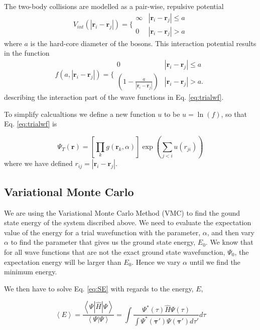 The two-body collisions are modelled as a pair-wise, repulsive potential 
 \begin{equation}
 V_{int}(|\mathbf{r}_i-\mathbf{r}_j|) =  \Bigg\{
 \begin{array}{ll}
	 \infty & {|\mathbf{r}_i-\mathbf{r}_j|} \leq {a}\\
	 0 & {|\mathbf{r}_i-\mathbf{r}_j|} > {a}
 \end{array}
 \end{equation}
where $a$ is the hard-core diameter of the bosons. This interaction potential results in the function
 \begin{equation}
    f(a,|\mathbf{r}_i-\mathbf{r}_j|)=\Bigg\{
 \begin{array}{ll}
	 0 & {|\mathbf{r}_i-\mathbf{r}_j|} \leq {a}\\
	 (1-\frac{a}{|\mathbf{r}_i-\mathbf{r}_j|}) & {|\mathbf{r}_i-\mathbf{r}_j|} > {a}.
 \end{array}
 \end{equation}
 describing the interaction part of the wave functions in Eq. \ref{eq:trialwf}.
 
 To simplify calcualtions we define a new function $u$ to be $u = \ln(f)$, so that Eq. \ref{eq:trialwf} is 
 
 \begin{equation*}
\Psi_T(\mathbf{r})=\left[
    \prod_k g(\mathbf{r}_k, \alpha)
\right]
\exp{\left(\sum_{j<i}u(r_{ji})\right)}
\end{equation*}
where we have defined $r_{ij}=|\mathbf{r}_i-\mathbf{r}_j|$.
 

\subsection{Variational Monte Carlo}

We are using the Variational Monte Carlo Method (VMC) to find the gound state energy of the system discribed above. We need to evaluate the expectation value of the energy for a trial wavefunction with the parameter, $\alpha$, and then vary $\alpha$ to find the parameter that gives us the ground state energy, $E_0$. We know that for all wave functions that are not the exact ground state wavefunction, $\Psi_0$, the expectation energy will be larger than $E_0$. Hence we vary $\alpha$ until we find the minimum energy.

We then have to solve Eq. \ref{eq:SE} with regards to the energy, $E$, 

\begin{equation}\label{eq:expec_value}
\left< E \right> = \frac{\left< \Psi | \hat{H}| \Psi \right>}{\left< \Psi | \Psi \right>} = \int \frac{\Psi^*(\tau) \hat{H} \Psi(\tau)}{\int \Psi^*(\mathbf{\tau}')\Psi(\mathbf{\tau}') d \tau' }d\tau 
\end{equation}

